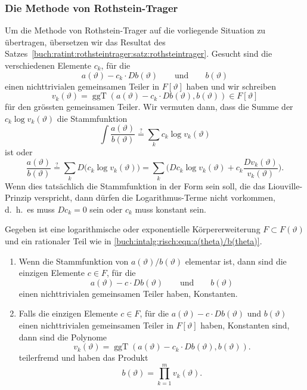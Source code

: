 \subsubsection{Die Methode von Rothstein-Trager}
Um die Methode von Rothstein-Trager auf die vorliegende Situation
zu übertragen, übersetzen wir das Resultat des
Satzes~\ref{buch:ratint:rothsteintrager:satz:rothsteintrager}.
Gesucht sind die verschiedenen Elemente $c_k$, für die 
\[
a(\vartheta) - c_k \cdot Db(\vartheta)
\qquad\text{und}\qquad
b(\vartheta)
\]
einen nichttrivialen gemeinsamen Teiler in $F[\vartheta]$ haben und
wir schreiben
\[
v_k(\vartheta)
=
\operatorname{ggT}(a(\vartheta)-c_k\cdot Db(\vartheta), b(\vartheta))
\in
F[\vartheta]
\]
für den grössten gemeinsamen Teiler.
Wir vermuten dann, dass die Summe der $c_k\log v_k(\vartheta)$ die
Stammfunktion
\[
\int
\frac{a(\vartheta)}{b(\vartheta)}
\overset{?}{=}
\sum_{k} c_k \log v_k(\vartheta)
\]
ist oder
\[
\frac{a(\vartheta)}{b(\vartheta)}
\overset{?}{=}
\sum_{k} D\biggl(c_k \log v_k(\vartheta)\biggr)
=
\sum_{k}\biggl(
Dc_k \log v_k(\vartheta)
+
c_k \frac{Dv_k(\vartheta)}{v_k(\vartheta)}
\biggr).
\]
Wenn dies tatsächlich die Stammfunktion in der Form sein soll, die
das Liouville-Prinzip verspricht, dann dürfen die Logarithmus-Terme
nicht vorkommen, d.~h.~es muss $Dc_k=0$ sein oder $c_k$ muss konstant
sein.

\begin{satz}
\label{buch:intalg:risch:satz:rothstein-trager-allgemein}
Gegeben ist eine logarithmische oder exponentielle Körpererweiterung
$F\subset F(\vartheta)$ und ein rationaler Teil wie in 
\eqref{buch:intalg:risch:eqn:a(theta)/b(theta)}.
\begin{enumerate}
\item Wenn die Stammfunktion von $a(\vartheta)/b(\vartheta)$ elementar ist,
dann sind die einzigen Elemente $c\in F$, für die
\[
a(\vartheta)-c\cdot Db(\vartheta)
\qquad\text{und}\qquad
b(\vartheta)
\]
einen nichttrivialen gemeinsamen Teiler haben, Konstanten.
\item
Falls die einzigen Elemente $c\in F$, für die 
$a(\vartheta)-c\cdot Db(\vartheta)$
und
$b(\vartheta)$
einen nichttrivialen gemeinsamen Teiler in $F[\vartheta]$ haben,
Konstanten sind, dann sind die Polynome
\begin{equation}
v_k(\vartheta)
=
\operatorname{ggT}(
a(\vartheta) - c_k\cdot Db(\vartheta), b(\vartheta)
).
\label{buch:intalg:risch:rothsteintrager:eqn:vk}
\end{equation}
teilerfremd und haben das Produkt
\[
b(\vartheta) = \prod_{k=1}^m v_k(\vartheta).
\]
\end{enumerate}
\end{satz}

